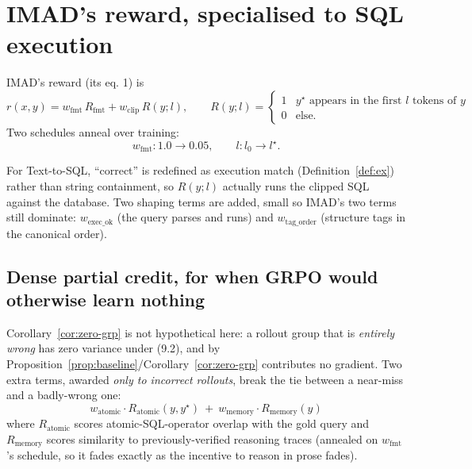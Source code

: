 \documentclass[11pt]{article}
\theoremstyle{definition}
\begin{document}
\section{IMAD's reward, specialised to SQL execution}

IMAD's reward (its eq. 1) is
\[
r(x,y) = w_{\mathrm{fmt}}\,R_{\mathrm{fmt}} + w_{\mathrm{clip}}\,R(y;l),
\qquad
R(y;l) = \begin{cases}1 & y^\star \text{ appears in the first } l \text{ tokens of } y\\ 0 & \text{else.}\end{cases}
\tag{9.2}
\]
Two schedules anneal over training:
\[
w_{\mathrm{fmt}}: 1.0 \to 0.05,\qquad l: l_0 \to l^\star .
\]

\begin{center}
\end{center}

For Text-to-SQL, ``correct'' is redefined as execution match (Definition~\ref{def:ex}) rather than string containment, so $R(y;l)$ actually runs the clipped SQL against the database. Two shaping terms are added, small so IMAD's two terms still dominate: $w_{\mathrm{exec\_ok}}$ (the query parses and runs) and $w_{\mathrm{tag\_order}}$ (structure tags in the canonical order).

\subsection{Dense partial credit, for when GRPO would otherwise learn nothing}
\label{sec:dense-partial-credit}

Corollary~\ref{cor:zero-grp} is not hypothetical here: a rollout group that is \emph{entirely wrong} has zero variance under (9.2), and by Proposition~\ref{prop:baseline}/Corollary~\ref{cor:zero-grp} contributes no gradient. Two extra terms, awarded \emph{only to incorrect rollouts}, break the tie between a near-miss and a badly-wrong one:
\[
w_{\mathrm{atomic}}\cdot R_{\mathrm{atomic}}(y,y^\star)
\ +\ w_{\mathrm{memory}}\cdot R_{\mathrm{memory}}(y)
\]
where $R_{\mathrm{atomic}}$ scores atomic-SQL-operator overlap with the gold query and $R_{\mathrm{memory}}$ scores similarity to previously-verified reasoning traces (annealed on $w_{\mathrm{fmt}}$'s schedule, so it fades exactly as the incentive to reason in prose fades).
\end{document}
